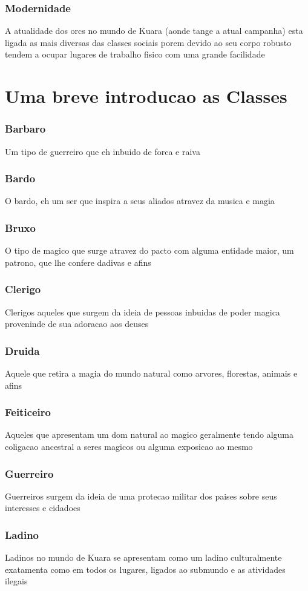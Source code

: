 \documentclass{book}
\begin{document}
\section{Modernidade}
A atualidade dos orcs no mundo de Kuara (aonde tange a atual campanha) esta ligada as mais 
diversas das classes sociais porem devido ao seu corpo robusto tendem a ocupar lugares de 
trabalho fisico com uma grande facilidade

\part{Uma breve introducao as Classes}
\section{Barbaro}
Um tipo de guerreiro que eh inbuido de forca e raiva 
\section{Bardo}
O bardo, eh um ser que inspira a seus aliados atravez da musica e magia
\section{Bruxo}
O tipo de magico que surge atravez do pacto com alguma entidade maior, um patrono, que lhe 
confere dadivas e afins
\section{Clerigo}
Clerigos aqueles que surgem da ideia de pessoas inbuidas de poder magica proveninde de 
sua adoracao aos deuses
\section{Druida}
Aquele que retira a magia do mundo natural como arvores, florestas, animais e afins
\section{Feiticeiro}
Aqueles que apresentam um dom natural ao magico geralmente tendo alguma coligacao ancestral 
a seres magicos ou alguma exposicao ao mesmo
\section{Guerreiro}
Guerreiros surgem da ideia de uma protecao militar dos paises sobre seus interesses e cidadoes
\section{Ladino}
Ladinos no mundo de Kuara se apresentam como um ladino culturalmente exatamenta como em 
todos os lugares, ligados ao submundo e as atividades ilegais 
\end{document}

